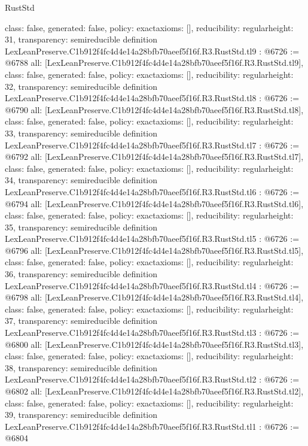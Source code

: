 \begin{lexlean}{RustStd}
\begin{coremodule}
{  class: false,
  generated: false,
  policy: exact{axioms: []},
  reducibility: regular{height: 31},
  transparency: semireducible
}
definition LexLeanPreserve.C1b912f4fc4d4e14a28bfb70aeef5f16f.R3.RustStd.tl9 : @6726 := @6788 {
  all: [LexLeanPreserve.C1b912f4fc4d4e14a28bfb70aeef5f16f.R3.RustStd.tl9],
  class: false,
  generated: false,
  policy: exact{axioms: []},
  reducibility: regular{height: 32},
  transparency: semireducible
}
definition LexLeanPreserve.C1b912f4fc4d4e14a28bfb70aeef5f16f.R3.RustStd.tl8 : @6726 := @6790 {
  all: [LexLeanPreserve.C1b912f4fc4d4e14a28bfb70aeef5f16f.R3.RustStd.tl8],
  class: false,
  generated: false,
  policy: exact{axioms: []},
  reducibility: regular{height: 33},
  transparency: semireducible
}
definition LexLeanPreserve.C1b912f4fc4d4e14a28bfb70aeef5f16f.R3.RustStd.tl7 : @6726 := @6792 {
  all: [LexLeanPreserve.C1b912f4fc4d4e14a28bfb70aeef5f16f.R3.RustStd.tl7],
  class: false,
  generated: false,
  policy: exact{axioms: []},
  reducibility: regular{height: 34},
  transparency: semireducible
}
definition LexLeanPreserve.C1b912f4fc4d4e14a28bfb70aeef5f16f.R3.RustStd.tl6 : @6726 := @6794 {
  all: [LexLeanPreserve.C1b912f4fc4d4e14a28bfb70aeef5f16f.R3.RustStd.tl6],
  class: false,
  generated: false,
  policy: exact{axioms: []},
  reducibility: regular{height: 35},
  transparency: semireducible
}
definition LexLeanPreserve.C1b912f4fc4d4e14a28bfb70aeef5f16f.R3.RustStd.tl5 : @6726 := @6796 {
  all: [LexLeanPreserve.C1b912f4fc4d4e14a28bfb70aeef5f16f.R3.RustStd.tl5],
  class: false,
  generated: false,
  policy: exact{axioms: []},
  reducibility: regular{height: 36},
  transparency: semireducible
}
definition LexLeanPreserve.C1b912f4fc4d4e14a28bfb70aeef5f16f.R3.RustStd.tl4 : @6726 := @6798 {
  all: [LexLeanPreserve.C1b912f4fc4d4e14a28bfb70aeef5f16f.R3.RustStd.tl4],
  class: false,
  generated: false,
  policy: exact{axioms: []},
  reducibility: regular{height: 37},
  transparency: semireducible
}
definition LexLeanPreserve.C1b912f4fc4d4e14a28bfb70aeef5f16f.R3.RustStd.tl3 : @6726 := @6800 {
  all: [LexLeanPreserve.C1b912f4fc4d4e14a28bfb70aeef5f16f.R3.RustStd.tl3],
  class: false,
  generated: false,
  policy: exact{axioms: []},
  reducibility: regular{height: 38},
  transparency: semireducible
}
definition LexLeanPreserve.C1b912f4fc4d4e14a28bfb70aeef5f16f.R3.RustStd.tl2 : @6726 := @6802 {
  all: [LexLeanPreserve.C1b912f4fc4d4e14a28bfb70aeef5f16f.R3.RustStd.tl2],
  class: false,
  generated: false,
  policy: exact{axioms: []},
  reducibility: regular{height: 39},
  transparency: semireducible
}
definition LexLeanPreserve.C1b912f4fc4d4e14a28bfb70aeef5f16f.R3.RustStd.tl1 : @6726 := @6804 {
}
\end{coremodule}
\end{lexlean}

